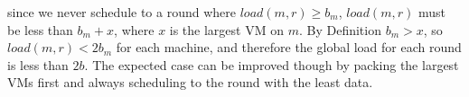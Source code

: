 since we never schedule to a round where $load(m,r) \ge b_m$, $load(m,r)$ must
be less than $b_m+x$, where $x$ is the largest VM on $m$. By Definition
$b_m > x$, so
$load(m,r) < 2b_m$ for each machine, and therefore the global load for each
round is less than $2b$.
The expected case can be improved though by
packing the largest VMs first and always scheduling to the round with the least
data.
